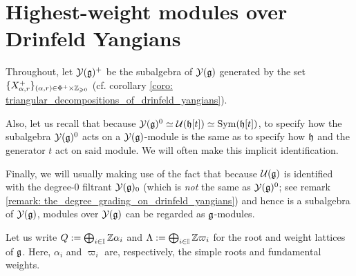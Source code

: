 \section{Highest-weight modules over Drinfeld Yangians} \label{section: highest_weight_modules_for_drinfeld_yangians}
    \begin{convention}
        Throughout, let $\mathcal{Y}(\mathfrak{g})^+$ be the  subalgebra of $\mathcal{Y}(\mathfrak{g})$ generated by the set $\{ X^+_{\alpha, r} \}_{(\alpha, r) \in \Phi^+ \x \Z_{\geq 0}}$ (cf. corollary \ref{coro: triangular_decompositions_of_drinfeld_yangians}).

        Also, let us recall that because $\mathcal{Y}(\mathfrak{g})^0 \simeq \mathcal{U}(\mathfrak{h}[t]) \simeq \mathrm{Sym}(\mathfrak{h}[t])$, to specify how the subalgebra $\mathcal{Y}(\mathfrak{g})^0$ acts on a $\mathcal{Y}(\mathfrak{g})$-module is the same as to specify how $\mathfrak{h}$ and the generator $t$ act on said module. We will often make this implicit identification.

        Finally, we will usually making use of the fact that because $\mathcal{U}(\mathfrak{g})$ is identified with the degree-$0$ filtrant $\mathcal{Y}(\mathfrak{g})_0$ (which is \textit{not} the same as $\mathcal{Y}(\mathfrak{g})^0$; see remark \ref{remark: the_degree_grading_on_drinfeld_yangians}) and hence is a subalgebra of $\mathcal{Y}(\mathfrak{g})$, modules over $\mathcal{Y}(\mathfrak{g})$ can be regarded as $\mathfrak{g}$-modules.
    \end{convention}

    \begin{convention}
        Let us write $Q := \bigoplus_{i \in \mathbb{I}} \mathbb{Z} \alpha_i$ and $\Lambda := \bigoplus_{i \in \mathbb{I}} \mathbb{Z} \varpi_i$ for the root and weight lattices of $\mathfrak{g}$. Here, $\alpha_i$ and $\varpi_i$ are, respectively, the simple roots and fundamental weights.
    \end{convention}

